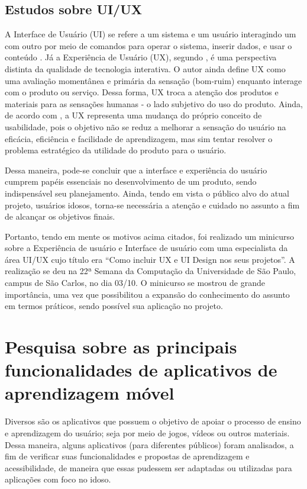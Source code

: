 \subsection{Estudos sobre UI/UX}
A Interface de Usuário (UI) se refere a um sistema e um usuário interagindo um com outro por meio de comandos para operar o sistema, inserir dados, e usar o conteúdo \citep{joo2015}. Já a Experiência de Usuário (UX), segundo \cite{marc2008}, é uma perspectiva distinta da qualidade de tecnologia interativa. O autor ainda define UX como uma avaliação momentânea e primária da sensação (bom-ruim) enquanto interage com o produto ou serviço. Dessa forma, UX troca a atenção dos produtos e materiais para as sensações humanas - o lado subjetivo do uso do produto. Ainda, de acordo com \cite{castilla2017}, a UX representa uma mudança do próprio conceito de usabilidade, pois o objetivo não se reduz a melhorar a sensação do usuário na eficácia, eficiência e facilidade de aprendizagem, mas sim tentar resolver o problema estratégico da utilidade do produto para o usuário. 

Dessa maneira, pode-se concluir que a interface e experiência do usuário cumprem papéis essenciais no desenvolvimento de um produto, sendo indispensável seu planejamento. Ainda, tendo em vista o público alvo do atual projeto, usuários idosos, torna-se necessária a atenção e cuidado no assunto a fim de alcançar os objetivos finais.

Portanto, tendo em mente os motivos acima citados, foi realizado um minicurso sobre a Experiência de usuário e Interface de usuário com uma especialista da área UI/UX cujo título era ``Como incluir UX e UI Design nos seus projetos''. A realização se deu na 22ª Semana da Computação da Universidade de São Paulo, campus de São Carlos, no dia 03/10. O minicurso se mostrou de grande importância, uma vez que possibilitou a expansão do conhecimento do assunto em termos práticos, sendo possível sua aplicação no projeto.

\section{Pesquisa sobre as principais funcionalidades de aplicativos de aprendizagem móvel} 
Diversos são os aplicativos que possuem o objetivo de apoiar o processo de ensino e aprendizagem do usuário; seja por meio de jogos, vídeos ou outros materiais. Dessa maneira, alguns aplicativos (para diferentes públicos) foram analisados, a fim de verificar suas funcionalidades e propostas de aprendizagem e acessibilidade, de maneira que essas pudessem ser adaptadas ou utilizadas para aplicações com foco no idoso.

